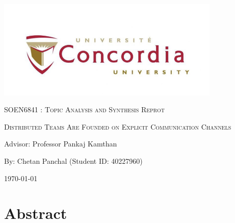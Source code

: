 \documentclass[12pt]{article}
\begin{document}
\begin{titlepage}
  \centering
  \includegraphics[width=0.8\textwidth]{image.jpeg}\par %
   \vspace{2cm}
  {\scshape\Large SOEN6841 : Topic Analysis and Synthesis Reprot \par}
  \vspace{1.5cm}
  {\scshape\Huge Distributed Teams Are Founded on Explicit
Communication Channels\par}
  \vspace{1.5cm}
  \vspace{1.5cm}
  {\large Advisor: Professor Pankaj Kamthan\par}
  \vspace{1.5cm}
  {\large By: Chetan Panchal (Student ID: 40227960)\par}
  \vspace{1cm}
  {\large \today\par}
\end{titlepage}


\tableofcontents
\newpage

\section*{Abstract}
\end{document}
